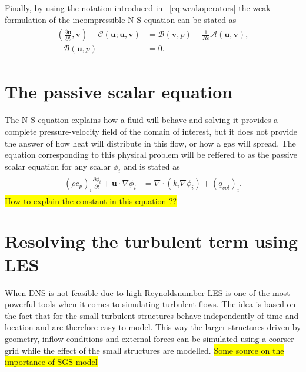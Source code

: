 Finally, by using the notation introduced in ~\ref{eq:weakoperators} the weak formulation of the incompressible
N-S equation can be stated as 
\begin{align}
    \begin{split}
        (\frac{\partial \mathbf{u}}{\partial t},\mathbf{v})
        - \mathcal{C}(\mathbf{u};\mathbf{u},\mathbf{v})
        &= \mathcal{B}(\mathbf{v},p) 
        +\frac{1}{Re}\mathcal{A}(\mathbf{u},\mathbf{v}), \\
        -\mathcal{B}(\mathbf{u},p) &= 0.
    \end{split}
	\label{eq:NSweak}
\end{align}


%
\section{The passive scalar equation}
The N-S equation explains how a fluid will behave and solving it provides a complete pressure-velocity field of the 
domain of interest, but it does not provide the answer of how heat will distribute in this flow, or how a gas will spread.
The equation corresponding to this physical problem will be reffered to as the passive scalar equation for any scalar 
$\phi_i$ and is stated as 
\begin{align}
    \begin{split}
        (\rho c_p)_i\frac{\partial \phi_i}{\partial t} + \mathbf{u}\cdot \nabla\phi_i 
        &= \nabla \cdot(k_i\nabla \phi_i)+ (q_{vol})_i.
    \end{split}
	\label{eq:PS}
\end{align}
\colorbox{yellow}{How to explain the constant in this equation ??} 
\section{Resolving the turbulent term using LES}
When DNS is not feasible due to high Reynoldsnumber LES is one of the most powerful tools when it comes to simulating turbulent flows.
The idea is based on the fact that for the small turbulent structures behave independently of time and location and are therefore 
easy to model. This way the larger structures driven by geometry, inflow conditions and external forces can be simulated using a coarser 
grid while the effect of the small structures are modelled. \colorbox{yellow}{Some source on the importance of SGS-model}

